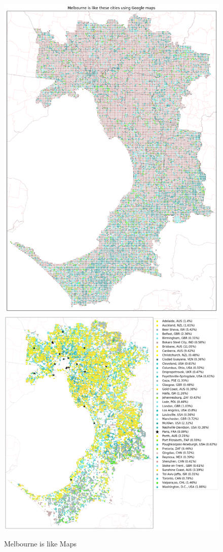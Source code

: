 \documentclass[sageh,times]{sagej}
\begin{document}
\begin{figure}[!htbp]
\centering    
\includegraphics[scale=0.25]{Images/MelbourneOverall_maps.png} 
\includegraphics[scale=0.25]{Images/MelbourneOverallAbrev_maps.png} 
\caption{Melbourne is like Maps}    
 \label{fig:melmaps}  
\end{figure} 
\end{document}
